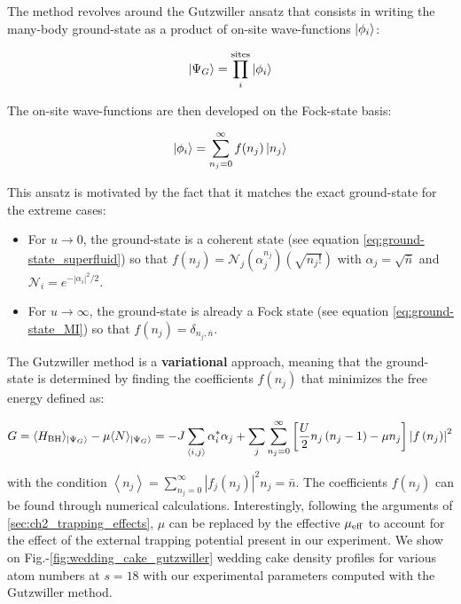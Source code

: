 The method revolves around the Gutzwiller ansatz that consists in writing the many-body ground-state as a product of on-site wave-functions $\ket{\phi_i}$:

\begin{equation}
    \ket{\Psi_G} = \prod_i^{\text{sites}} \ket{\phi_i}
\end{equation}

\noindent The on-site wave-functions are then developed on the Fock-state basis:

\begin{equation}
    \ket{\phi_i}= \sum_{n_j=0}^{\infty} f(n_j) \ket{n_j}
\end{equation}

This ansatz is motivated by the fact that it matches the exact ground-state for the extreme cases:

\begin{itemize}
    \item For $u \to 0$, the ground-state is a coherent state (see equation \ref{eq:ground-state_superfluid}) so that $f(n_j) = \mathcal{N}_{j}  (\alpha_{j}^{n_{j}})(\sqrt{n_{j} !})$ with $\alpha_j=\sqrt{\bar{n}}$ and $\mathcal{N}_{i}=e^{-\left|\alpha_{i}\right|^{2} / 2}$.
    \item For $u \to \infty$, the ground-state is already a Fock state (see equation \ref{eq:ground-state_MI}) so that $f(n_j) = \delta_{n_j,\bar{n}}$.
\end{itemize}

The Gutzwiller method is a \textbf{variational} approach, meaning that the ground-state is determined by finding the coefficients $f(n_j)$ that minimizes the free energy defined as:

\begin{equation}
    G = \langle H_{\mathrm{BH}}\rangle_{\ket{\Psi_G}} - \mu \langle N\rangle_{\ket{\Psi_G}} = -J \sum_{\langle i, j\rangle} \alpha_{i}^{*} \alpha_{j}+\sum_{j} \sum_{n_{j}=0}^{\infty}\left[\frac{U}{2} n_{j}\left(n_{j}-1\right)-\mu n_{j}\right]\left|f\left(n_{j}\right)\right|^{2}
\end{equation}

\noindent with the condition $\left\langle n_{j}\right\rangle=\sum_{n_{j}=0}^{\infty}\left|f_{j}\left(n_{j}\right)\right|^{2} n_{j}=\bar{n}$. The coefficients $f(n_j)$ can be found through numerical calculations. Interestingly, following the arguments of \ref{sec:ch2_trapping_effects}, $\mu$ can be replaced by the effective $\mu_{\rm{eff}}$ to account for the effect of the external trapping potential present in our experiment. We show on Fig.-\ref{fig:wedding_cake_gutzwiller} wedding cake density profiles for various atom numbers at $s=18$ with our experimental parameters computed with the Gutzwiller method.

